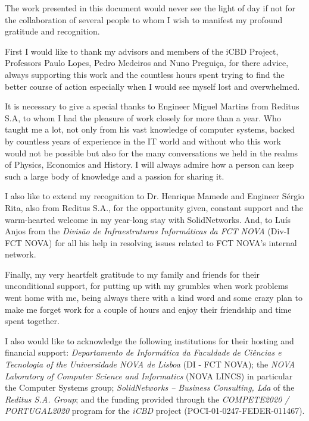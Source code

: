 \acknowledgements

The work presented in this document would never see the light of day if not for the collaboration of several people to whom I wish to manifest my profound gratitude and recognition. 

First I would like to thank my advisors and members of the iCBD Project, Professors Paulo Lopes, Pedro Medeiros and Nuno Preguiça, for there advice, always supporting this work and the countless hours spent trying to find the better course of action especially when I would see myself lost and overwhelmed.

It is necessary to give a special thanks to Engineer Miguel Martins from Reditus S.A, to whom I had the pleasure of work closely for more than a year. Who taught me a lot, not only from his vast knowledge of computer systems, backed by countless years of experience in the IT world and without who this work would not be possible but also for the many conversations we held in the realms of Physics, Economics and History. I will always admire how a person can keep such a large body of knowledge and a passion for sharing it.

I also like to extend my recognition to Dr. Henrique Mamede and Engineer Sérgio Rita, also from Reditus S.A., for the opportunity given, constant support and the warm-hearted welcome in my year-long stay with SolidNetworks. And, to Luís Anjos from the \textit{Divisão de Infraestruturas Informáticas da FCT NOVA} (Div-I FCT NOVA) for all his help in resolving issues related to FCT NOVA's internal network.

Finally, my very heartfelt gratitude to my family and friends for their unconditional support, for putting up with my grumbles when work problems went home with me, being always there with a kind word and some crazy plan to make me forget work for a couple of hours and enjoy their friendship and time spent together.

I also would like to acknowledge the following institutions for their hosting and financial support: \textit{Departamento de Informática da Faculdade de Ciências e Tecnologia of the Universidade NOVA de Lisboa} (DI - FCT NOVA); the \textit{NOVA Laboratory of Computer Science and Informatics} (NOVA LINCS) in particular the Computer Systems group; \textit{SolidNetworks – Business Consulting, Lda} of the \textit{Reditus S.A. Group}; and the funding provided through the \textit{COMPETE2020 / PORTUGAL2020} program for the \textit{iCBD} project (POCI-01-0247-FEDER-011467).